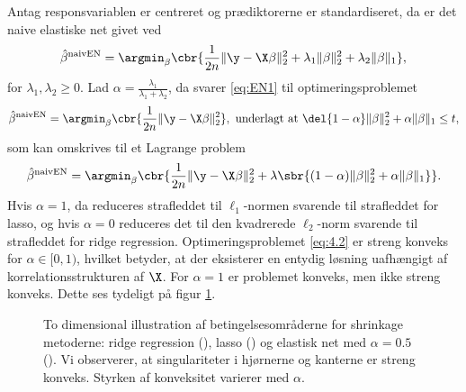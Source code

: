 Antag responsvariablen er centreret og prædiktorerne er standardiseret, da er det naive elastiske net givet ved
\begin{align}
\hat{\beta}^\text{naivEN} = \argmin_{\beta} \cbr{ \frac{1}{2n} \Vert \y - \X \beta \Vert_2^2 + \lambda_1 \Vert \beta \Vert_2^2 + \lambda_2 \Vert \beta \Vert_1}, \label{eq:EN1}
\end{align}
for \(\lambda_1, \lambda_2 \geq 0\).
Lad \(\alpha = \frac{\lambda_1}{\lambda_1 + \lambda_2}\), da svarer \eqref{eq:EN1} til optimeringsproblemet
\begin{align*}
\hat{\beta}^\text{naivEN} = \argmin_{\beta} \cbr{\frac{1}{2n} \Vert \y - \X \beta \Vert_2^2}, \ \text{underlagt at } \del{1-\alpha} \Vert \beta \Vert_2^2 + \alpha \Vert \beta \Vert_1 \leq t,
\end{align*}
som kan omskrives til et Lagrange problem
\begin{align}
\hat{\beta}^\text{naivEN} =\argmin_{\beta} \cbr{\frac{1}{2n} \Vert \y - \X \beta \Vert_2^2 + \lambda \sbr{(1- \alpha) \Vert \beta \Vert_2^2 + \alpha \Vert \beta \Vert_1}}. \label{eq:4.2}
\end{align}
Hvis $\alpha=1$, da reduceres strafleddet til $\ell_1$-normen svarende til strafleddet for lasso, og hvis $\alpha=0$ reduceres det til den kvadrerede $\ell_2$-norm svarende til strafleddet for ridge regression.
Optimeringsproblemet  \eqref{eq:4.2} er streng konveks for \(\alpha \in [0,1)\), hvilket betyder, at der eksisterer en entydig løsning uafhængigt af korrelationsstrukturen af $\X$.
For  \(\alpha=1\) er problemet konveks, men ikke streng konveks.
Dette ses tydeligt på figur \ref{fig:elastisk}.
%
\begin{figure}[H]
\centering
\scalebox{0.8}{}
\caption[optional short text]{To dimensional illustration af betingelsesområderne for shrinkage metoderne: ridge regression (), lasso () og elastisk net med \(\alpha = 0.5\) (). Vi observerer, at singulariteter i hjørnerne og kanterne er streng konveks. Styrken af konveksitet varierer med \(\alpha\).} \label{fig:elastisk}
\end{figure}
%
